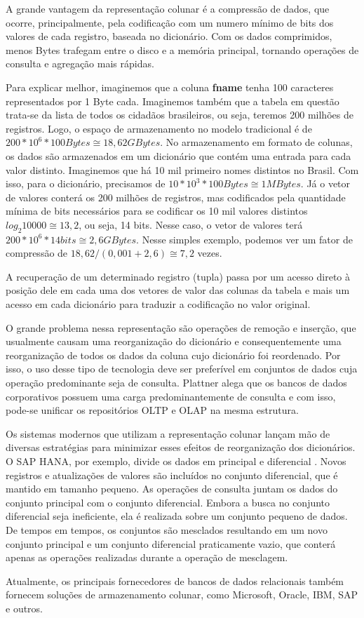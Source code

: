 A grande vantagem da representação colunar é a compressão de dados, que ocorre, principalmente, pela codificação com um numero mínimo de bits dos valores de cada registro, baseada no dicionário. Com os dados comprimidos, menos Bytes trafegam entre o disco e a memória principal, tornando operações de consulta e agregação mais rápidas.

Para explicar melhor, imaginemos que a coluna \textbf{fname} tenha 100 caracteres representados por 1 Byte cada. Imaginemos também que a tabela em questão trata-se da lista de todos os cidadãos brasileiros, ou seja, teremos 200 milhões de registros. Logo, o espaço de armazenamento no modelo tradicional é de $ 200*10^6 * 100 Bytes \cong 18,62 GBytes  $. No armazenamento em formato de colunas, os dados são armazenados em um dicionário que contém uma entrada para cada valor distinto. Imaginemos que há 10 mil primeiro nomes distintos no Brasil. Com isso, para o dicionário, precisamos de $ 10*10^3 * 100 Bytes \cong 1 MBytes  $. Já o vetor de valores conterá os 200 milhões de registros, mas codificados pela quantidade mínima de bits necessários para se codificar os 10 mil valores distintos $ log_2 10000 \cong 13,2  $, ou seja, 14 bits. Nesse caso, o vetor de valores terá $ 200*10^6 * 14 bits \cong 2,6 GBytes  $. Nesse simples exemplo, podemos ver um fator de compressão de $ 18,62 / (0,001 + 2,6) \cong 7,2 $ vezes.

A recuperação de um determinado registro (tupla) passa por um acesso direto à posição dele em cada uma dos vetores de valor das colunas da tabela e mais um acesso em cada dicionário para traduzir a codificação no valor original.

O grande problema nessa representação são operações de remoção e inserção, que usualmente causam uma reorganização do dicionário e consequentemente uma reorganização de todos os dados da coluna cujo dicionário foi reordenado. Por isso, o uso desse tipo de tecnologia deve ser preferível em conjuntos de dados cuja operação predominante seja de consulta. Plattner \cite{plattner2009common} alega que os bancos de dados corporativos possuem uma carga predominantemente de consulta e com isso, pode-se unificar os repositórios OLTP e OLAP na mesma estrutura. 

Os sistemas modernos que utilizam a representação colunar lançam mão de diversas estratégias para minimizar esses efeitos de reorganização dos dicionários. O SAP HANA, por exemplo, divide os dados em principal e diferencial \cite{plattner2012memory}. Novos registros e atualizações de valores são incluídos no conjunto diferencial, que é mantido em tamanho pequeno. As operações de consulta juntam os dados do conjunto principal com o conjunto diferencial. Embora a busca no conjunto diferencial seja ineficiente, ela é realizada sobre um conjunto pequeno de dados. De tempos em tempos, os conjuntos são mesclados resultando em um novo conjunto principal e um conjunto diferencial praticamente vazio, que conterá apenas as operações realizadas durante a operação de mesclagem.

Atualmente, os principais fornecedores de bancos de dados relacionais também fornecem soluções de armazenamento colunar, como Microsoft, Oracle, IBM, SAP e outros.  




